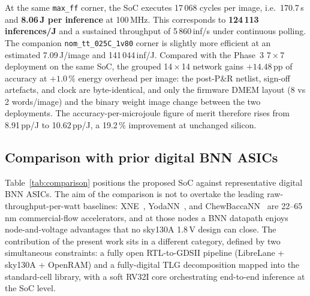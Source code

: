 \documentclass[conference]{IEEEtran}
\begin{document}
At the same \texttt{max\_ff} corner, the SoC executes 17\,068 cycles
per image, i.e.\ 170.7\,\textmu s and \textbf{8.06\,\textmu J per
  inference} at 100\,MHz. This corresponds to \textbf{124\,113
  inferences/J} and a sustained throughput of 5\,860\,inf/s under
continuous polling. The companion \texttt{nom\_tt\_025C\_1v80} corner
is slightly more efficient at an estimated 7.09\,\textmu J/image and
141\,044\,inf/J. Compared with the Phase~3 7\,\(\times\)\,7
deployment on the same SoC, the grouped 14\,\(\times\)\,14 network
gains $+14.48$\,pp of accuracy at $+1.0\,\%$ energy overhead per
image: the post-P\&R netlist, sign-off artefacts, and clock are
byte-identical, and only the firmware DMEM layout (8 vs 2 words/image)
and the binary weight image change between the two deployments. The
accuracy-per-microjoule figure of merit therefore rises from
8.91\,pp/\textmu J to 10.62\,pp/\textmu J, a 19.2\,\% improvement at
unchanged silicon.

\subsection{Comparison with prior digital BNN ASICs}
\label{sec:eval:comparison}

Table~\ref{tab:comparison} positions the proposed SoC against
representative digital BNN ASICs. The aim of the comparison is not to
overtake the leading raw-throughput-per-watt baselines:
XNE~\cite{xne2018}, YodaNN~\cite{yodann2018}, and
ChewBaccaNN~\cite{chewbaccann2021} are 22--65\,nm commercial-flow
accelerators, and at those nodes a BNN datapath enjoys node-and-voltage
advantages that no sky130A 1.8\,V design can close. The contribution
of the present work sits in a different category, defined by two
simultaneous constraints: a fully open RTL-to-GDSII pipeline
(LibreLane + sky130A + OpenRAM) and a fully-digital TLG decomposition
mapped into the standard-cell library, with a soft RV32I core
orchestrating end-to-end inference at the SoC level.
\end{document}
